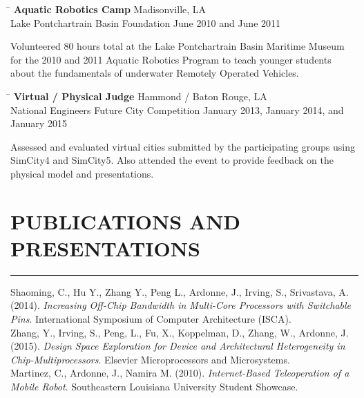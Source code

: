 \documentclass{res}
\begin{document}
\begin{resume}
		
	\begin{tabbing}
		\hspace{4.475in}\= \kill %
		{\bf Aquatic Robotics Camp} \> \hspace{0.475in}Madisonville, LA \\
		Lake Pontchartrain Basin Foundation \> June 2010 and June 2011
	\end{tabbing}\vspace{-20pt}
	\vspace{8pt}Volunteered 80 hours total at the Lake Pontchartrain Basin Maritime Museum for the 2010 and 2011 Aquatic Robotics Program to teach younger students about the fundamentals of underwater Remotely Operated Vehicles.
	
	\begin{tabbing}
		\hspace{3.125in}\= \kill %
		{\bf Virtual / Physical Judge} \> \hspace{1in}Hammond / Baton Rouge, LA \\
		National Engineers Future City Competition \> January 2013, January 2014, and January 2015
	\end{tabbing}\vspace{-20pt}
	\vspace{8pt}Assessed and evaluated virtual cities submitted by the participating groups using SimCity4 and SimCity5. Also attended the event to provide feedback on the physical model and presentations.


\section{PUBLICATIONS AND PRESENTATIONS}
	\vspace{0.005in}	
	\rule{\textwidth}{0.5pt}
	Shaoming, C., Hu Y., Zhang Y., Peng L., Ardonne, J., Irving, S., Srivastava, A. (2014). \textit{Increasing Off-Chip Bandwidth in Multi-Core Processors with Switchable Pins}. International Symposium of Computer Architecture (ISCA).\\
	
	\vspace{-0.25in}
	Zhang, Y., Irving, S., Peng, L., Fu, X., Koppelman, D., Zhang, W., Ardonne, J. (2015).  \textit{Design Space Exploration for Device and Architectural Heterogeneity in Chip-Multiprocessors}.  Elsevier Microprocessors and Microsystems. \\
	
	\vspace{-0.25in}
	Martinez, C., Ardonne, J., Namira M. (2010). \textit{Internet-Based Teleoperation of a Mobile Robot}. Southeastern Louisiana University Student Showcase.
	\clearpage



\end{resume}
\end{document}
